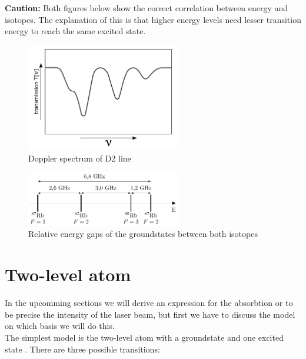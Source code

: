 \textbf{Caution:} Both figures below show the correct correlation between energy and isotopes. The explanation of this is that higher
energy levels need lesser transition energy to reach the same excited state. 

\vspace{\fill}

\begin{figure}[h]
\centering
\includegraphics[width=0.6\textwidth]{spectrum_doppler}
\caption{Doppler spectrum of D2 line}
\label{fig:doppler} 
\end{figure}

\vspace{\fill}
\pagebreak

\begin{figure}[h]
\centering
\includegraphics[width=0.6\textwidth]{groundstate}
\caption{Relative energy gaps of the groundstates between both isotopes}
\label{fig:gap} 
\end{figure}

\section{Two-level atom} %

In the upcomming sections we will derive an expression for the absorbtion or to be precise the
intensity of the laser beam, but first we have to discuss the model on which basis we will do this.\\

The simplest model is the two-level atom with a groundstate  and one excited state . There are three
possible transitions:\\


